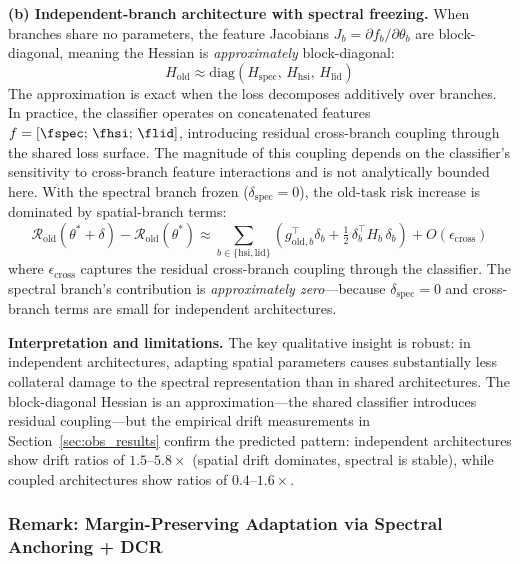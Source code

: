 \begin{proposition}
\textbf{(b) Independent-branch architecture with spectral freezing.}
When branches share no parameters, the feature Jacobians $J_b = \partial f_b / \partial \theta_b$ are block-diagonal, meaning the Hessian is \emph{approximately} block-diagonal:
\begin{equation}
    H_{\mathrm{old}} \approx \mathrm{diag}(H_{\mathrm{spec}},\, H_{\mathrm{hsi}},\, H_{\mathrm{lid}})
\end{equation}
The approximation is exact when the loss decomposes additively over branches.
In practice, the classifier operates on concatenated features $f = [\fspec;\, \fhsi;\, \flid]$, introducing residual cross-branch coupling through the shared loss surface. The magnitude of this coupling depends on the classifier's sensitivity to cross-branch feature interactions and is not analytically bounded here.
With the spectral branch frozen ($\delta_{\mathrm{spec}} = 0$), the old-task risk increase is dominated by spatial-branch terms:
\begin{equation}
    \mathcal{R}_{\mathrm{old}}(\theta^* + \delta) - \mathcal{R}_{\mathrm{old}}(\theta^*) \approx \sum_{b \in \{\mathrm{hsi, lid}\}} \left(g_{\mathrm{old},b}^\top \delta_b + \tfrac{1}{2}\,\delta_b^\top H_b\, \delta_b\right) + O(\epsilon_{\mathrm{cross}})
\label{eq:independent_risk}
\end{equation}
where $\epsilon_{\mathrm{cross}}$ captures the residual cross-branch coupling through the classifier.
The spectral branch's contribution is \emph{approximately zero}---because $\delta_{\mathrm{spec}} = 0$ and cross-branch terms are small for independent architectures.
\end{proposition}

\textbf{Interpretation and limitations.}
The key qualitative insight is robust: in independent architectures, adapting spatial parameters causes substantially less collateral damage to the spectral representation than in shared architectures.
The block-diagonal Hessian is an approximation---the shared classifier introduces residual coupling---but the empirical drift measurements in Section~\ref{sec:obs_results} confirm the predicted pattern: independent architectures show drift ratios of $1.5$--$5.8\times$ (spatial drift dominates, spectral is stable), while coupled architectures show ratios of $0.4$--$1.6\times$.

\subsubsection{Remark: Margin-Preserving Adaptation via Spectral Anchoring + DCR}
\label{app:margin}

